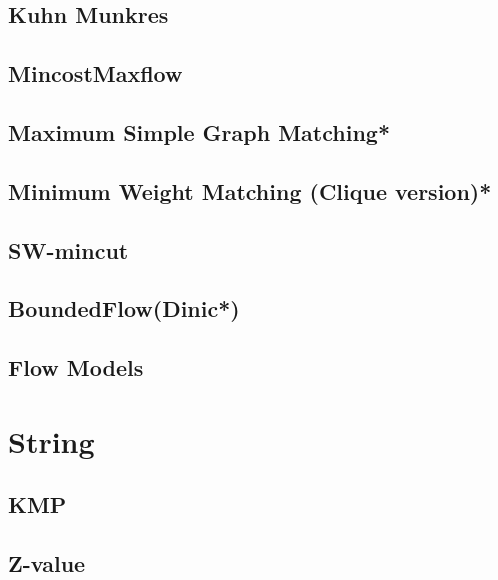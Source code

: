 \subsection{Kuhn Munkres}

\subsection{MincostMaxflow}

\subsection{Maximum Simple Graph Matching*} %

\subsection{Minimum Weight Matching (Clique version)*} %

\subsection{SW-mincut}

\subsection{BoundedFlow(Dinic*)} %

\subsection{Flow Models}

% 


\section{String}
\subsection{KMP}

\subsection{Z-value}

